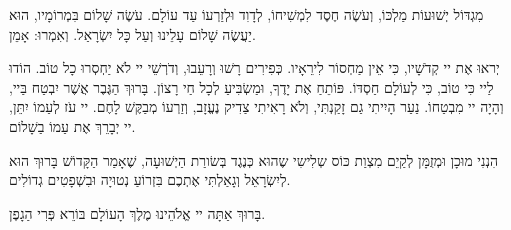 \vspace{1em}

מִגְדּוֹל יְשׁוּעוֹת מַלְכּוֹ, וְעֹשֶׂה חֶסֶד לִמְשִׁיחוֹ, לְדָוִד וּלְזַרְעוֹ עַד עוֹלָם. עֹשֶׂה שָׁלוֹם בִּמְרוֹמָיו, הוּא יַעֲשֶׂה שָׁלוֹם עָלֵינוּ וְעַל כָּל יִשְׂרָאַל. וְאִמְרוּ: אָמֵן.

יְראוּ אֶת יי קְדֹשָׁיו, כִּי אֵין מַחְסוֹר לִירֵאָיו. כְּפִירִים רָשׁוּ וְרָעֵבוּ, וְדֹרְשֵׁי יי לֹא יַחְסְרוּ כָל טוֹב. הוֹדוּ לַיי כִּי טוֹב, כִּי לְעוֹלָם חַסְדּוֹ. פּוֹתֵחַ אֶת יָדֶךָ, וּמַשְׂבִּיעַ לְכָל חַי רָצוֹן. בָּרוּךְ הַגֶּבֶר אֲשֶׁר יִבְטַח בַּיי, וְהָיָה יי מִבְטַחוֹ. נַעַר הָיִיתִי גַם זָקַנְתִּי, וְלֹא רָאִיתִי צַדִיק נֶעֱזָב, וְזַרְעוֹ מְבַקֶּשׁ לָחֶם. יי עֹז לְעַמוֹ יִתֵּן, יי יְבָרֵךְ אֶת עַמוֹ בַשָׁלוֹם.

\vspace{1em}


הִנְנִי מוּכָן וּמְזֻמָּן לְקַיֵם מִצְוַת כּוֹס שְלִישִי שֶהוּא כְּנֶגֶד בְּשׂורַת הַיְשׁוּעָה, שֶׁאָמַר הַקָּדוֹשׁ בָּרוּךְ הוּא לְיִשְׂרָאֵל וְגָאַלְתִּי אֶתְכֶם בִּזְרוֹעַ נְטוּיָה וּבִשְׁפָטִים גְדוֹלִים.

בָּרוּךְ אַתָּה יי אֱלֹהֵינוּ מֶלֶךְ הָעוֹלָם בּוֹרֵא פְּרִי הַגָפֶן.


\break